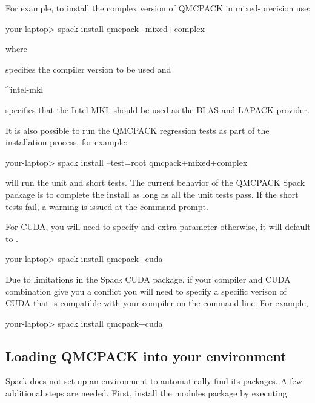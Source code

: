 For example, to install the complex version of QMCPACK in mixed-precision use:

\begin{shade}
your-laptop> spack install qmcpack+mixed+complex%
\end{shade}
where

\begin{shade}
\end{shade}
specifies the compiler version to be used and

\begin{shade}
^intel-mkl
\end{shade}
specifies that the Intel MKL should be used as the BLAS and LAPACK provider.

It is also possible to run the QMCPACK regression tests as part of the
installation process, for example:

\begin{shade}
your-laptop> spack install --test=root qmcpack+mixed+complex%
\end{shade}
will run the unit and short tests. The current behavior of the QMCPACK
Spack package is to complete the install as long as all the unit tests
pass. If the short tests fail, a warning is issued at the command prompt.

For CUDA, you will need to specify and extra 
parameter otherwise, it will default to .
\begin{shade}
your-laptop> spack install qmcpack+cuda%
\end{shade}

Due to limitations in the Spack CUDA package, if your compiler and
CUDA combination give you a conflict you will need to specify a
specific verison of CUDA that is compatible with your compiler on the
command line. For example,
\begin{shade}
your-laptop> spack install qmcpack+cuda%
\end{shade}

\subsection{Loading QMCPACK into your environment}
Spack does not set up an environment to automatically find its packages. A few additional steps are needed. First, install the
modules package by executing:

